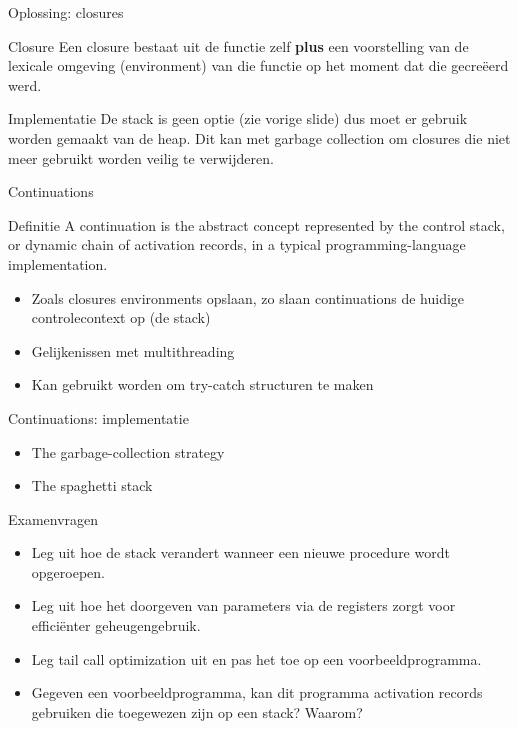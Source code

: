 \documentclass{beamer}
\begin{document}
\begin{frame}{Oplossing: closures}
	\begin{block}{Closure}
		Een closure bestaat uit de functie zelf \textbf{plus} een voorstelling van de lexicale omgeving (environment) van die functie op het moment dat die gecreëerd werd.
	\end{block}
	\begin{block}{Implementatie}
		De stack is geen optie (zie vorige slide) dus moet er gebruik worden gemaakt van de heap. Dit kan met garbage collection om closures die niet meer gebruikt worden veilig te verwijderen.
	\end{block}
\end{frame}

\begin{frame}{Continuations}
	\begin{block}{Definitie}
	    A continuation is the abstract concept represented by the control stack, or dynamic chain of activation records, in a typical programming-language implementation.
	\end{block}
	\begin{itemize}
	    \item Zoals closures environments opslaan, zo slaan continuations de huidige controlecontext op (de stack)
	    \item Gelijkenissen met multithreading
	    \item Kan gebruikt worden om try-catch structuren te maken
	\end{itemize}
\end{frame}

\begin{frame}{Continuations: implementatie}
	\begin{itemize}
	    \item The garbage-collection strategy
	    \item The spaghetti stack
	\end{itemize}
\end{frame}

\begin{frame}{Examenvragen}
    \begin{itemize}
        \item Leg uit hoe de stack verandert wanneer een nieuwe procedure wordt opgeroepen.
        \item Leg uit hoe het doorgeven van parameters via de registers zorgt voor efficiënter geheugengebruik.
        \item Leg tail call optimization uit en pas het toe op een voorbeeldprogramma.
        \item Gegeven een voorbeeldprogramma, kan dit programma activation records gebruiken die toegewezen zijn op een stack? Waarom?
    \end{itemize}
\end{frame}
\end{document}
